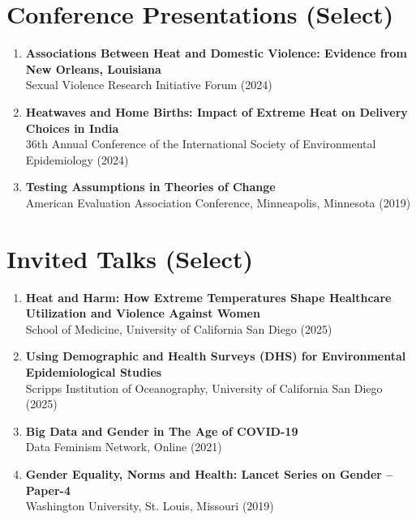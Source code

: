 \documentclass[11pt,letterpaper]{article}
\begin{document}
\section*{Conference Presentations (Select)}
\label{sec:org84e58ba}

\begin{enumerate}
\item \textbf{Associations Between Heat and Domestic Violence: Evidence from New Orleans, Louisiana}\\
Sexual Violence Research Initiative Forum (2024) 

\item \textbf{Heatwaves and Home Births: Impact of Extreme Heat on Delivery Choices in India}\\
36th Annual Conference of the International Society of Environmental Epidemiology (2024) 

\item \textbf{Testing Assumptions in Theories of Change}\\
American Evaluation Association Conference, Minneapolis, Minnesota (2019) 
\end{enumerate}
\section*{Invited Talks (Select)}
\label{sec:org6b36993}

\begin{enumerate}
\item \textbf{Heat and Harm: How Extreme Temperatures Shape Healthcare Utilization and Violence Against Women}\\
School of Medicine, University of California San Diego (2025) 

\item \textbf{Using Demographic and Health Surveys (DHS) for Environmental Epidemiological Studies}\\
Scripps Institution of Oceanography, University of California San Diego (2025) 

\item \textbf{Big Data and Gender in The Age of COVID-19}\\
Data Feminism Network, Online (2021) 

\item \textbf{Gender Equality, Norms and Health: Lancet Series on Gender – Paper-4}\\
Washington University, St. Louis, Missouri (2019) 
\end{enumerate}
\end{document}
